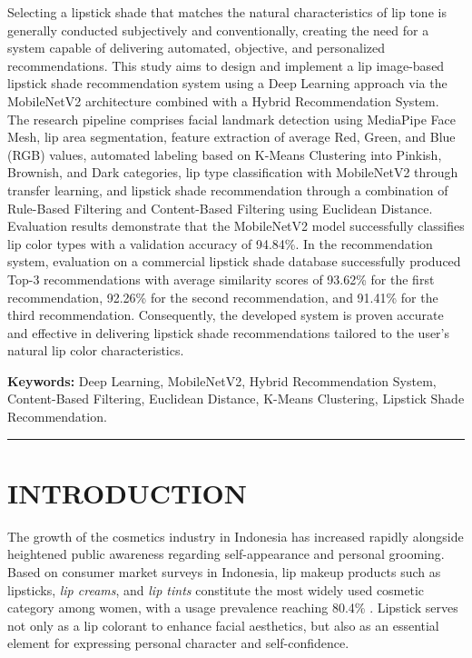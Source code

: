 \documentclass[10pt,a4paper]{article}
\begin{document}
{\fontsize{9.5pt}{12pt}\selectfont
Selecting a lipstick shade that matches the natural characteristics of lip tone is generally conducted subjectively and conventionally, creating the need for a system capable of delivering automated, objective, and personalized recommendations. This study aims to design and implement a lip image-based lipstick shade recommendation system using a Deep Learning approach via the MobileNetV2 architecture combined with a Hybrid Recommendation System. The research pipeline comprises facial landmark detection using MediaPipe Face Mesh, lip area segmentation, feature extraction of average Red, Green, and Blue (RGB) values, automated labeling based on K-Means Clustering into Pinkish, Brownish, and Dark categories, lip type classification with MobileNetV2 through transfer learning, and lipstick shade recommendation through a combination of Rule-Based Filtering and Content-Based Filtering using Euclidean Distance. Evaluation results demonstrate that the MobileNetV2 model successfully classifies lip color types with a validation accuracy of 94.84\%. In the recommendation system, evaluation on a commercial lipstick shade database successfully produced Top-3 recommendations with average similarity scores of 93.62\% for the first recommendation, 92.26\% for the second recommendation, and 91.41\% for the third recommendation. Consequently, the developed system is proven accurate and effective in delivering lipstick shade recommendations tailored to the user's natural lip color characteristics.\par}

\vspace{4pt}
{\fontsize{9.5pt}{12pt}\selectfont\textbf{Keywords:} Deep Learning, MobileNetV2, Hybrid Recommendation System, Content-Based Filtering, Euclidean Distance, K-Means Clustering, Lipstick Shade Recommendation.\par}

\vspace{3pt}
\noindent\rule{\textwidth}{0.4pt}
\vspace{4pt}

\section{INTRODUCTION}

The growth of the cosmetics industry in Indonesia has increased rapidly alongside heightened public awareness regarding self-appearance and personal grooming. Based on consumer market surveys in Indonesia, lip makeup products such as lipsticks, \textit{lip creams}, and \textit{lip tints} constitute the most widely used cosmetic category among women, with a usage prevalence reaching 80.4\% \cite{jakpat2025}. Lipstick serves not only as a lip colorant to enhance facial aesthetics, but also as an essential element for expressing personal character and self-confidence.
\end{document}
